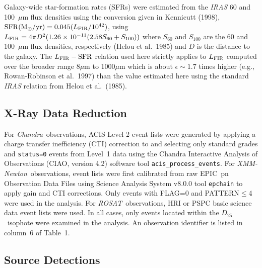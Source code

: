 \documentclass{article}
\newcommand{\cxo}{{\sl Chandra}}
\newcommand{\xmm}{{\sl XMM-Newton}}
\newcommand{\ros}{{\sl ROSAT}}
\newcommand{\etal}{et al.}
\newcommand{\elip}{{$D_{25}$}}
\begin{document}
Galaxy-wide star-formation rates (SFRs) were estimated from the {\sl IRAS}
60 and 100~$\mu$m flux densities using the conversion given in 
Kennicutt (1998), 
${\rm SFR} ({\rm M}_{\odot}/{\rm yr}) = 0.045(L_{{\rm FIR}}/10^{42})$,
using $L_{\rm{FIR}} = 4 \pi D^2 (1.26\times 10^{-11} (2.58 S_{60} + S_{100}))$
where $S_{60}$ and $S_{100}$ are the 60 and 100~$\mu$m flux densities,
respectively (Helou \etal\ 1985) and $D$ is the distance to the galaxy. %
%
The $L_{\rm {FIR}} - \rm{SFR}$ relation used here strictly applies to $L_{\rm FIR}$
computed over the broader range 8$\mu$m to 1000$\mu$m which is about $\epsilon \sim 1.7$ times 
higher (e.g., Rowan-Robinson \etal\ 1997)
than the value estimated here using the standard {\sl IRAS} relation from Helou \etal\ (1985).

\subsection{X-Ray Data Reduction}

For \cxo\ observations,
  ACIS Level 2 event lists were generated
  by applying a charge transfer inefficiency (CTI) correction to
 and selecting only standard grades and {\tt status=0} events
   from Level~1 data using the 
 Chandra Interactive Analysis of Observations (CIAO, version 4.2) 
 software tool {\tt acis\_process\_events}.
%
For \xmm\ observations, 
 event lists were first calibrated from raw EPIC~pn Observation Data Files
  using Science Analysis System v8.0.0 tool {\tt epchain}
 to apply gain and CTI corrections.
Only events with FLAG=0 and PATTERN$\le$4 
 were used in the analysis.
%
For \ros\ observations, HRI or PSPC 
  basic science data event lists were used.
In all cases, only
 events located within the \elip\ isophote were examined in the analysis.
An observation identifier is listed in column~6 of Table~1.

\subsection{Source Detections}
\end{document}
